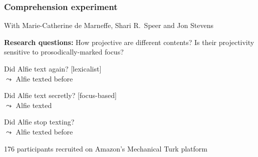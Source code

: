 \documentclass[pdf,xcolor=table,envcountsect,handout]{beamer}
\begin{document}
\begin{frame}
\frametitle{Comprehension experiment}

With Marie-Catherine de Marneffe, Shari R.\ Speer and Jon Stevens

\medskip
\pause

{\bf Research questions:} How projective are different contents? Is their projectivity sensitive to prosodically-marked focus?

\medskip

\begin{exe}

\begin{xlist}

\ex Did Alfie text again? \hfill [lexicalist] \\ $\leadsto$ Alfie texted before

\ex Did Alfie text secretly? \hfill [focus-based] \\ $\leadsto$ Alfie texted

\ex Did Alfie stop texting? \\ $\leadsto$ Alfie texted before
 
\end{xlist}

\end{exe}

\medskip

\pause

176 participants recruited on Amazon's Mechanical Turk platform

\end{frame}
\end{document}
